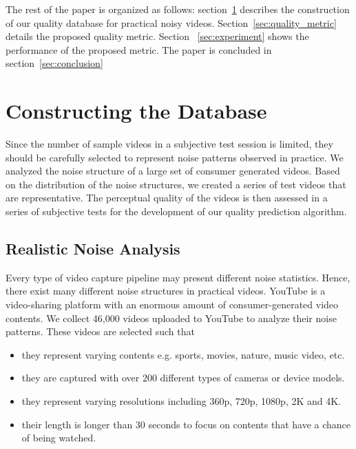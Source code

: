\documentclass{sig-alternate}
\begin{document}
The rest of the paper is organized as follows: section~\ref{sec:noise_quailty_database} describes the construction of our quality database for practical noisy videos. Section~\ref{sec:quality_metric} details the proposed quality metric. Section ~\ref{sec:experiment} shows the performance of the proposed metric. The paper is concluded in section~\ref{sec:conclusion}

\section{Constructing the Database}
\label{sec:noise_quailty_database}
Since the number of sample videos in a subjective test session is limited, they should be carefully selected to represent noise patterns observed in practice. We analyzed the noise structure of a large set of consumer generated videos. Based on the distribution of the noise structures, we created a series of test videos that are representative. The perceptual quality of the videos is then assessed in a series of subjective tests for the development of our quality prediction algorithm.
\subsection{Realistic Noise Analysis}
\label{sec:noise_analysis}
Every type of video capture pipeline may present different noise statistics. Hence, there exist many different noise structures in practical videos. YouTube is a video-sharing platform with an enormous amount of consumer-generated video contents. We collect 46,000 videos uploaded to YouTube to analyze their noise patterns. These videos are selected such that
\begin{itemize}[leftmargin=*]
\setlength\itemsep{-0.2em}
\item they represent varying contents e.g. sports, movies, nature, music video, etc. 
\item they are captured with over 200 different types of cameras or device models.
\item they represent varying resolutions including 360p, 720p, 1080p, 2K and 4K.
\item their length is longer than 30 seconds to focus on contents that have a chance of being watched. 
\end{itemize}
\end{document}
